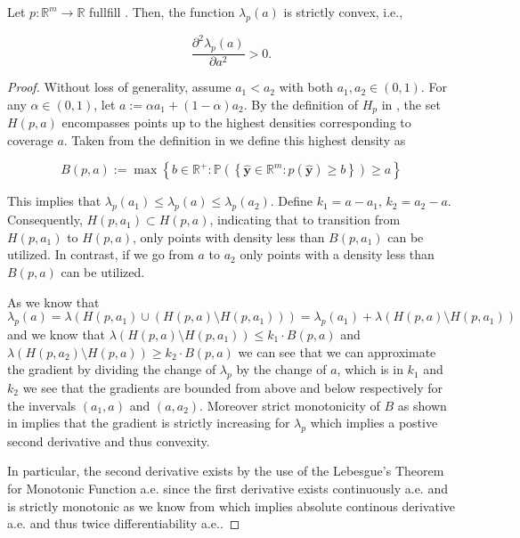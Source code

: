 \begin{lemma}
    Let \(p: \mathbb{R}^m \to \mathbb{R}\) fullfill . Then, the function $\lambda_{p}(a)$ is strictly convex, i.e.,

    \begin{equation}
        \frac{\partial^2 \lambda_{p}(a)}{\partial a^2} > 0.
    \end{equation}

\end{lemma}
\begin{proof}
    Without loss of generality, assume \(a_1 < a_2\) with both \(a_1, a_2 \in (0,1)\). For any \(\alpha \in (0, 1)\), let \(a := \alpha a_1 + (1-\alpha) a_2\). By the definition of \(H_p\) in , the set \(H(p, a)\) encompasses points up to the highest densities corresponding to coverage \(a\). Taken from the definition in  we define this highest density as

    \begin{equation}
        B(p, a):=\max \left\{b \in \mathbb{R^+}: \mathbb{P}\left(\left\{\mathbf{\hat{y}}
        \in
        \mathbb{R}^m: p(\mathbf{\hat{y}}) \geq b\right\}\right) \geq a
        \right\}
    \end{equation}

    This implies that \(\lambda_{p}(a_1) \leq \lambda_{p}(a) \leq \lambda_{p}(a_2)\). Define $k_1 = a-a_1$, $k_2 = a_2 - a$. Consequently, \(H(p, a_1) \subset H(p, a)\), indicating that to transition from \(H(p, a_1)\) to \(H(p, a)\), only points with density less than $B(p, a_1)$ can be utilized. In contrast, if we go from $a$ to $a_2$ only points with a density less than $B(p, a)$ can be utilized.

    As we know that
    \begin{equation}
        \lambda_p(a) = \lambda(H(p, a_1) \cup (H(p,a)\setminus H(p,a_1))) = \lambda_p(a_1) + \lambda(H(p,a)\setminus H(p, a_1))
    \end{equation}
    and we know that $\lambda(H(p,a)\setminus H(p, a_1)) \leq k_1 \cdot B(p, a)$ and $\lambda(H(p,a_2)\setminus H(p, a)) \geq k_2 \cdot B(p, a)$ we can see that we can approximate the gradient by dividing the change of $\lambda_p$ by the change of $a$, which is in $k_1$ and $k_2$ we see that the gradients are bounded from above and below respectively for the invervals $(a_1, a)$ and $(a, a_2)$. Moreover strict monotonicity of $B$ as shown in  implies that the gradient is strictly increasing for $\lambda_p$ which implies a postive second derivative and thus convexity.

    In particular, the second derivative exists by the use of the Lebesgue's Theorem for Monotonic Function a.e. since the first derivative exists continuously a.e. and is strictly monotonic as we know from  which implies absolute continous derivative a.e. and thus twice differentiability a.e..
\end{proof}

